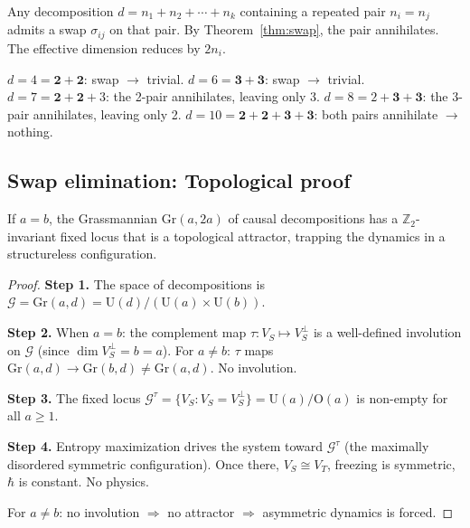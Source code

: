 \begin{corollary}
\label{cor:annihilate}
Any decomposition $d = n_1 + n_2 + \cdots + n_k$ containing a repeated pair $n_i = n_j$ admits a swap $\sigma_{ij}$ on that pair. By Theorem~\ref{thm:swap}, the pair annihilates. The effective dimension reduces by $2n_i$.
\end{corollary}

\begin{example}
$d = 4 = \mathbf{2+2}$: swap $\to$ trivial. \;
$d = 6 = \mathbf{3+3}$: swap $\to$ trivial. \;
$d = 7 = \mathbf{2+2}+3$: the 2-pair annihilates, leaving only 3. \;
$d = 8 = 2+\mathbf{3+3}$: the 3-pair annihilates, leaving only 2. \;
$d = 10 = \mathbf{2+2}+\mathbf{3+3}$: both pairs annihilate $\to$ nothing.
\end{example}

\subsection{Swap elimination: Topological proof}

\begin{theorem}
\label{thm:grassmann}
If $a = b$, the Grassmannian $\text{Gr}(a, 2a)$ of causal decompositions has a $\mathbb{Z}_2$-invariant fixed locus that is a topological attractor, trapping the dynamics in a structureless configuration.
\end{theorem}

\begin{proof}
\textbf{Step 1.}
The space of decompositions is $\mathcal{G} = \text{Gr}(a, d) = \text{U}(d)/(\text{U}(a) \times \text{U}(b))$.

\textbf{Step 2.}
When $a = b$: the complement map $\tau: V_S \mapsto V_S^\perp$ is a well-defined involution on $\mathcal{G}$ (since $\dim V_S^\perp = b = a$). For $a \neq b$: $\tau$ maps $\text{Gr}(a, d) \to \text{Gr}(b, d) \neq \text{Gr}(a, d)$. No involution.

\textbf{Step 3.}
The fixed locus $\mathcal{G}^\tau = \{V_S : V_S = V_S^\perp\} = \text{U}(a)/\text{O}(a)$ is non-empty for all $a \geq 1$.

\textbf{Step 4.}
Entropy maximization drives the system toward $\mathcal{G}^\tau$ (the maximally disordered symmetric configuration). Once there, $V_S \cong V_T$, freezing is symmetric, $\hbar$ is constant. No physics.

For $a \neq b$: no involution $\Rightarrow$ no attractor $\Rightarrow$ asymmetric dynamics is forced.
\end{proof}

